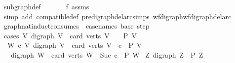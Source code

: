 \begin{isabellebody}
\ subgraph{\isacharunderscore}{\kern0pt}def\ \isanewline
\ \ \ \ \isamarkupfalse%
\ f{}\ assms{\isacharparenleft}{\kern0pt}{}{\isacharparenright}{\kern0pt}\ \isamarkupfalse%
\ {\isacharparenleft}{\kern0pt}simp\ add{\isacharcolon}{\kern0pt}\ compatible{\isacharunderscore}{\kern0pt}def\ pre{\isacharunderscore}{\kern0pt}digraph{\isachardot}{\kern0pt}del{\isacharunderscore}{\kern0pt}arc{\isacharunderscore}{\kern0pt}simps\ wf{\isacharunderscore}{\kern0pt}digraph{\isachardot}{\kern0pt}wf{\isacharunderscore}{\kern0pt}digraph{\isacharunderscore}{\kern0pt}del{\isacharunderscore}{\kern0pt}arc{\isacharparenright}{\kern0pt}\isanewline
{}\isamarkupfalse%
%
\endisatagproof
{\isafoldproof}%
%
\isadelimproof
\isanewline
%
\endisadelimproof
\isanewline
{}\isamarkupfalse%
\ graph{\isacharunderscore}{\kern0pt}nat{\isacharunderscore}{\kern0pt}induct{\isacharbrackleft}{\kern0pt}consumes\ {}{\isacharcomma}{\kern0pt}\ case{\isacharunderscore}{\kern0pt}names\ base\ step{\isacharbrackright}{\kern0pt}{\isacharcolon}{\kern0pt}\ \isanewline
\ \ \isanewline
\isanewline
\ cases{\isacharcolon}{\kern0pt}\ {\isachardoublequoteopen}{\isasymAnd}V{\isachardot}{\kern0pt}\ {\isacharparenleft}{\kern0pt}digraph\ V\ {\isasymLongrightarrow}\ card\ {\isacharparenleft}{\kern0pt}verts\ V{\isacharparenright}{\kern0pt}\ {\isacharequal}{\kern0pt}\ {}\ {\isasymLongrightarrow}\ P\ V{\isacharparenright}{\kern0pt}{\isachardoublequoteclose}\isanewline
\ \ {\isachardoublequoteopen}{\isasymAnd}W\ c{\isachardot}{\kern0pt}\ {\isacharparenleft}{\kern0pt}{\isasymAnd}V{\isachardot}{\kern0pt}\ {\isacharparenleft}{\kern0pt}digraph\ V\ {\isasymLongrightarrow}\ card\ {\isacharparenleft}{\kern0pt}verts\ V{\isacharparenright}{\kern0pt}\ {\isacharequal}{\kern0pt}\ c\ {\isasymLongrightarrow}\ P\ V{\isacharparenright}{\kern0pt}{\isacharparenright}{\kern0pt}\ \isanewline
\ \ {\isasymLongrightarrow}\ {\isacharparenleft}{\kern0pt}digraph\ W\ {\isasymLongrightarrow}\ card\ {\isacharparenleft}{\kern0pt}verts\ W{\isacharparenright}{\kern0pt}\ {\isacharequal}{\kern0pt}\ {\isacharparenleft}{\kern0pt}Suc\ c{\isacharparenright}{\kern0pt}\ {\isasymLongrightarrow}\ P\ W{\isacharparenright}{\kern0pt}{\isachardoublequoteclose}\isanewline
{}\ {\isachardoublequoteopen}{\isasymAnd}Z{\isachardot}{\kern0pt}\ digraph\ Z\ {\isasymLongrightarrow}\ P\ Z{\isachardoublequoteclose}\isanewline
%
\isadelimproof
%
\endisadelimproof
%
\isatagproof
{}\isamarkupfalse%
\ {\isacharminus}{\kern0pt}\ \isanewline

\end{isabellebody}
